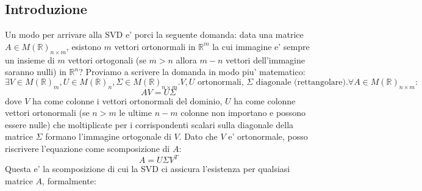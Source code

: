 \subsection{Introduzione}
Un modo per arrivare alla SVD e' porci la seguente domanda: data una matrice $ A \in M(\mathbb{R})_{n \times m} $, esistono $ m $ vettori ortonormali in $ \mathbb{R}^m $ la cui immagine e' sempre un insieme di $ m $ vettori ortogonali (se $ m > n $ allora $ m -n $ vettori dell'immagine saranno nulli) in $ \mathbb{R}^n $? Proviamo a scrivere la domanda in modo piu' matematico:
\[
  \exists V \in M(\mathbb{R})_{m}, U \in M(\mathbb{R})_n, \Sigma \in M(\mathbb{R})_{n \times m}. V, U \text{ ortonormali, } \Sigma \text{ diagonale (rettangolare)}. \forall A \in M(\mathbb{R})_{n \times m}:
\]
\[
 AV = U\Sigma
\]
dove $ V $ ha come colonne i vettori ortonormali del dominio, $ U $ ha come colonne vettori ortonormali (se $ n > m $ le ultime $ n-m $ colonne non importano e possono essere nulle) che moltiplicate per i corrispondenti scalari sulla diagonale della matrice $ \Sigma $ formano l'immagine ortogonale di $ V $. Dato che $ V $ e' ortonormale, posso riscrivere l'equazione come scomposizione di $ A $:
\[
A = U\Sigma V^T
\]
Questa e' la scomposizione di cui la SVD ci assicura l'esistenza per qualsiasi matrice $ A $, formalmente:

